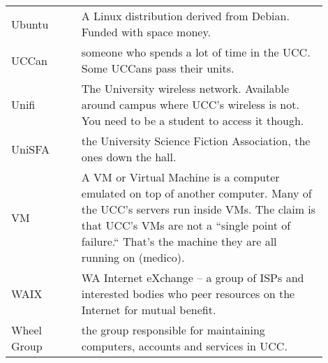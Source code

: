 {\begin{tabular}{p{0.2\linewidth}|p{0.7\linewidth}}
Ubuntu &
A Linux distribution derived from Debian. Funded with space money. \\
UCCan &
someone who spends a lot of time in the UCC. Some UCCans pass their units. \\
Unifi &
The University wireless network. Available around campus where UCC's wireless is not. You need to be a student to access it though. \\
UniSFA &
the University Science Fiction Association, the ones down the hall. \\
VM &
A VM or Virtual Machine is a computer emulated on top of another computer. Many of the UCC's servers run inside VMs. The claim is that UCC's VMs are not a ``single point of  failure.`` That's the machine they are all running on (medico). \\
WAIX &
WA Internet eXchange -- a group of ISPs and interested bodies who peer resources on the Internet for mutual benefit. \\
Wheel Group &
the group responsible for maintaining computers, accounts and services in UCC. \\
\end{tabular}}
